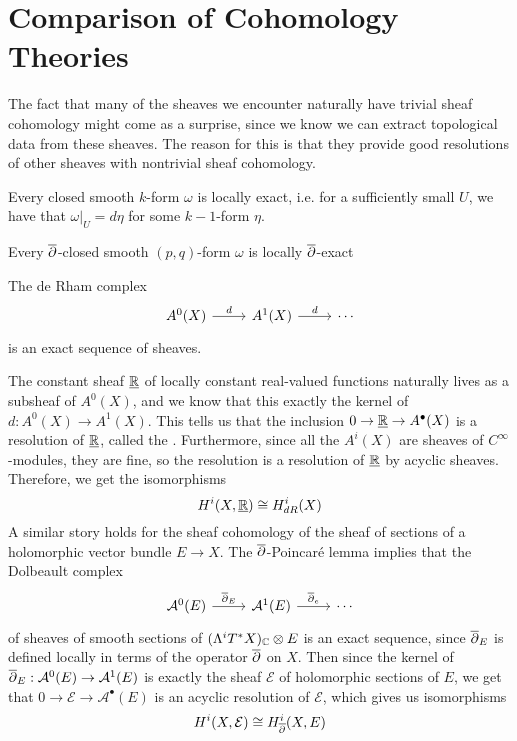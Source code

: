 \section{Comparison of Cohomology Theories}
%
The fact that many of the sheaves we encounter naturally have trivial sheaf cohomology
might come as a surprise, since we know we can extract topological data from
these sheaves. The reason for this is that they provide good resolutions of
other sheaves with nontrivial sheaf cohomology.
%
\begin{prop}
Every closed smooth $k$-form $\omega$ is locally exact, i.e. for a sufficiently
small $U$, we have that $\omega\vert_U = d\eta$ for some $k-1$-form $\eta$.
\end{prop}
%
\begin{prop}
Every $\overline{\partial}$-closed smooth $(p,q)$-form $\omega$ is locally $\overline{\partial}$-exact
\end{prop}
%
\begin{cor}
The de Rham complex
\[\begin{tikzcd}
A^0(X) \ar[r, "d"] & A^1(X) \ar[r, "d"] & \cdots
\end{tikzcd}\]
is an exact sequence of sheaves.
\end{cor}
%
The constant sheaf $\underline{\mathbb{R}}$ of locally constant real-valued functions
naturally lives as a subsheaf of $A^0(X)$, and we know that this exactly
the kernel of $d : A^0(X) \to A^1(X)$. This tells us that the inclusion
$0 \to \underline{\mathbb{R}} \to A^\bullet(X)$ is a resolution of $\underline{\mathbb{R}}$,
called the . Furthermore,
since all the $A^i(X)$ are sheaves of $C^\infty$-modules, they are fine, so
the resolution is a resolution of $\underline{\mathbb{R}}$ by acyclic sheaves. Therefore,
we get the isomorphisms
\[
H^i(X, \underline{\mathbb{R}}) \cong H^i_{dR}(X)
\]
A similar story holds for the sheaf cohomology of the sheaf of sections of a holomorphic
vector bundle $E \to X$. The $\overline{\partial}$-Poincar\'e lemma implies that the Dolbeault
complex
\[\begin{tikzcd}
\mathcal{A}^0(E) \ar[r, "\dbar_E"] & \mathcal{A}^1(E) \ar[r, "\dbar_e"] & \cdots
\end{tikzcd}\]
of sheaves of smooth sections of $(\Lambda^i T^*X)_{\mathbb{C}} \otimes E$ is an exact sequence,
since $\overline{\partial}_E$ is defined locally in terms of the operator $\overline{\partial}$ on $X$.
Then since the kernel of $\overline{\partial}_E : \mathcal{A}^0(E) \to \mathcal{A}^1(E)$ is
exactly the sheaf $\mathcal{E}$ of holomorphic sections of $E$, we get that
$0 \to \mathcal{E} \to \mathcal{A}^\bullet(E)$ is an acyclic resolution of
$\mathcal{E}$, which gives us isomorphisms
\[
H^i(X,\mathcal{E}) \cong H^i_{\overline{\partial}}(X, E)
\]
%
%
%
%